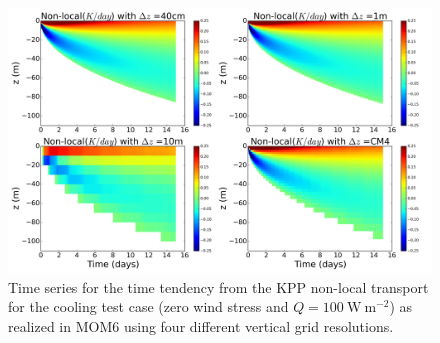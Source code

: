 \begin{figure}[h!t]
\begin{center}
\includegraphics[angle=0,width=14cm]{./figs/MOM6/cooling_KPP_MOM6_nonlocal_temp_tendency.png}
\caption[KPP nonlocal time tendency from MOM6 cooling test]{\sf Time
  series for the time tendency from the KPP non-local transport for
  the cooling test case (zero wind stress and
  $Q=100~\mbox{W}~\mbox{m}^{-2}$) as realized in MOM6 using four
  different vertical grid resolutions.}
\label{fig:MOM6_KPP_nonlocal-cooling}
\end{center}
\end{figure}



